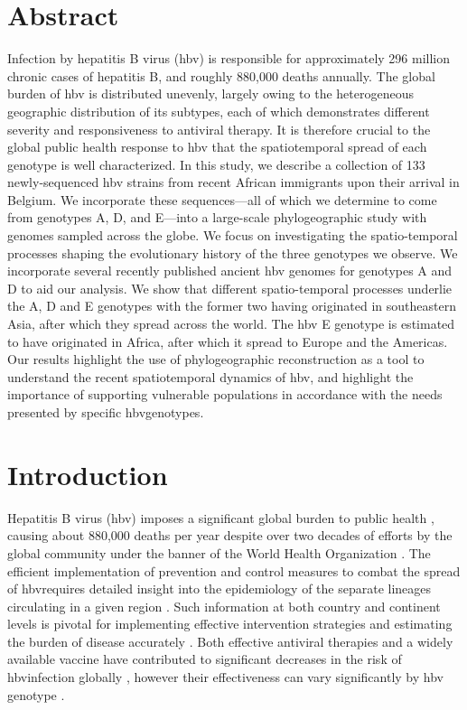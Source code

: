 \section{Abstract}
Infection by hepatitis B virus (\gls{hbv}) is responsible for approximately 296 million chronic cases of hepatitis B, and roughly 880,000 deaths annually.
The global burden of \gls{hbv} is distributed unevenly, largely owing to the heterogeneous geographic distribution of its subtypes, each of which demonstrates different severity and responsiveness to antiviral therapy.
It is therefore crucial to the global public health response to \gls{hbv} that the spatiotemporal spread of each genotype is well characterized.
In this study, we describe a collection of 133 newly-sequenced \gls{hbv} strains from recent African immigrants upon their arrival in Belgium.
We incorporate these sequences---all of which we determine to come from genotypes A, D, and E---into a large-scale phylogeographic study with genomes sampled across the globe.
We focus on investigating the spatio-temporal processes shaping the evolutionary history of the three genotypes we observe.
We incorporate several recently published ancient \gls{hbv} genomes for genotypes A and D to aid our analysis.
We show that different spatio-temporal processes underlie the A, D and E genotypes with the former two having originated in southeastern Asia, after which they spread across the world.
The \gls{hbv} E genotype is estimated to have originated in Africa, after which it spread to Europe and the Americas.
Our results highlight the use of phylogeographic reconstruction as a tool to understand the recent spatiotemporal dynamics of \gls{hbv}, and highlight the importance of supporting vulnerable populations in accordance with the needs presented by specific \gls{hbv}genotypes.

\section{Introduction}
Hepatitis B virus (\gls{hbv}) imposes a significant global burden to public health \cite{pourkarim2011molecular,malik2022viral}, causing about 880,000 deaths per year \cite{revill2020evolution} despite over two decades of efforts by the global community under the banner of the World Health Organization \cite{pourkarim2018iran}.
The efficient implementation of prevention and control measures to combat the spread of \gls{hbv}requires detailed insight into the epidemiology of the separate lineages circulating in a given region \cite{schweitzer2015estimations,pourkarim2011guidelines}.
Such information at both country and continent levels is pivotal for implementing effective intervention strategies and estimating the burden of disease accurately \cite{pourkarim2011molecular}.
Both effective antiviral therapies and a widely available vaccine have contributed to significant decreases in the risk of \gls{hbv}infection globally \cite{lu2020virus}, however their effectiveness can vary significantly by \gls{hbv} genotype \cite{bottecchia2011detection}.\\

